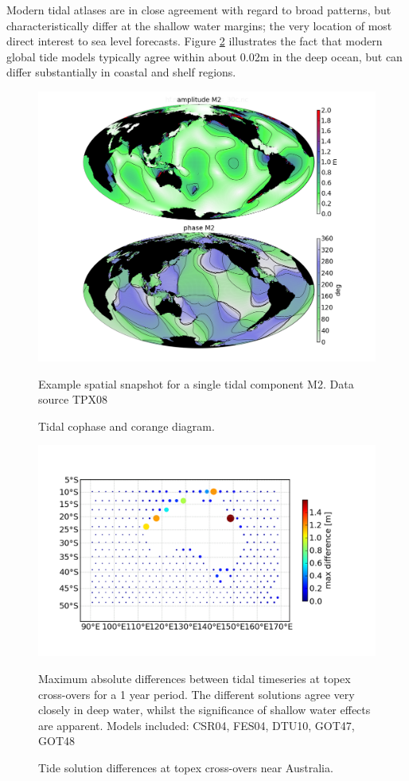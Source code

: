 Modern tidal atlases are in close agreement with regard to broad patterns, but characteristically differ at the shallow water margins; the very location of most direct interest to sea level forecasts.  Figure \ref{fig:tpx_cross} illustrates the fact that modern global tide models typically agree within about 0.02m in the deep ocean, but can differ substantially in coastal and shelf regions.  
\begin{figure}[!hbt] \centering
    \includegraphics[width=\figwidthBig]{figures/maps/global_m2_tpx08.png}
    \caption{Tidal cophase and corange diagram.}{Example spatial snapshot for a single tidal component M2.  Data source TPX08 \citep{Egbert:2002ug}  }
    \label{fig:atlas}
\end{figure}
\begin{figure}[!hbt] \centering
    \includegraphics[width=\figwidthBig]{figures/maps/map_tide_differences_tpx_xovers.png}
    \caption{Tide solution differences at topex cross-overs near Australia.}{Maximum absolute differences between tidal timeseries at topex cross-overs for a 1 year period. The different solutions agree very closely in deep water, whilst the significance of shallow water effects are apparent.  Models included: CSR04\citep{Eanes:1996tr}, FES04\citep{Lyard:2006ir}, DTU10\citep{IMPROVEMENTOFGLOBA:2010tu}, GOT47, GOT48\citep{Schrama:1994vr}\citep{Ray:1999vm} }
    \label{fig:tpx_cross}
\end{figure}

